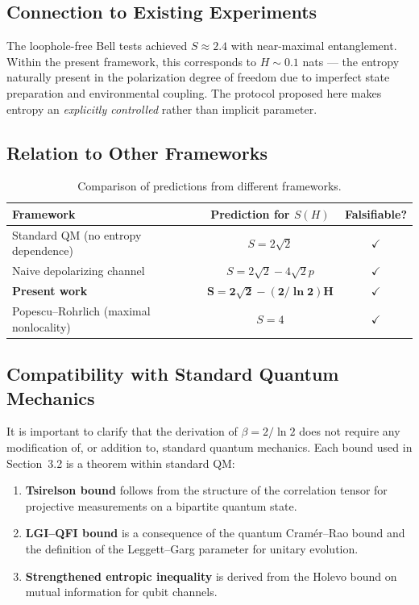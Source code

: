 \documentclass[a4paper]{quantumarticle}
\begin{document}
\subsection{Connection to Existing Experiments}

The loophole-free Bell tests \cite{hensen2015loophole, giustina2015loophole, shalm2015loophole} achieved $S \approx 2.4$ with near-maximal entanglement. Within the present framework, this corresponds to $H \sim 0.1$ nats --- the entropy naturally present in the polarization degree of freedom due to imperfect state preparation and environmental coupling. The protocol proposed here makes entropy an \emph{explicitly controlled} rather than implicit parameter.

\subsection{Relation to Other Frameworks}

\begin{table}[H]
\centering
\begin{tabular}{lcc}
\toprule
Framework & Prediction for $S(H)$ & Falsifiable? \\
\midrule
Standard QM (no entropy dependence) & $S = 2\sqrt{2}$ & $\checkmark$ \\
Naive depolarizing channel & $S = 2\sqrt{2} - 4\sqrt{2}p$ & $\checkmark$ \\
\textbf{Present work} & $\mathbf{S = 2\sqrt{2} - (2/\ln 2)H}$ & $\mathbf{\checkmark}$ \\
Popescu--Rohrlich (maximal nonlocality) & $S = 4$ & $\checkmark$ \\
\bottomrule
\end{tabular}
\caption{Comparison of predictions from different frameworks.}
\label{tab:frameworks}
\end{table}

\subsection{Compatibility with Standard Quantum Mechanics}

It is important to clarify that the derivation of $\beta = 2/\ln 2$ does not require any modification of, or addition to, standard quantum mechanics. Each bound used in Section~3.2 is a theorem within standard QM:

\begin{enumerate}
\item \textbf{Tsirelson bound} \cite{tsirelson1980quantum} follows from the structure of the correlation tensor for projective measurements on a bipartite quantum state.
\item \textbf{LGI--QFI bound} \cite{abboud2026lgi} is a consequence of the quantum Cram\'{e}r--Rao bound and the definition of the Leggett--Garg parameter for unitary evolution.
\item \textbf{Strengthened entropic inequality} \cite{hall2013correlation} is derived from the Holevo bound on mutual information for qubit channels.
\end{enumerate}
\end{document}

